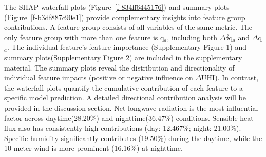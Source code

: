 \bgroup
{}
\begin{figure*}[!htbp]
\centering \makeatletter{}
\makeatother 
\caption{{\textbf{SHAP summary plots showing the distribution and magnitude of feature group impacts}. (a (daytime), b (nighttime)) Each point represents a single instance; the horizontal position indicates the SHAP value (positive values denote an increase in predicted \ensuremath{\Delta }UHI, negative a decrease); the color represents the original feature values (blue: low, red: high).}}
\label{f-b3df887c90e1}
\end{figure*}
\egroup
The SHAP waterfall plots (Figure~\ref{f-834ff6445176}) and summary plots (Figure~\ref{f-b3df887c90e1}) provide complementary insights into feature group contributions. A feature group consists of all variables of the same metric. The only feature group with more than one feature is q\ensuremath{_{a}}, including both \ensuremath{\Delta }\ensuremath{\delta }q\ensuremath{_{a}} and \ensuremath{\Delta }q\ensuremath{_{a}}. The individual feature's feature importance (Supplementary Figure 1) and summary plots(Supplementary Figure 2) are included in the supplementary material. The summary plots reveal the distribution and directionality of individual feature impacts (positive or negative influence on \ensuremath{\Delta }UHI). \mbox{}\protect\newline In contrast, the waterfall plots quantify the cumulative contribution of each feature to a specific model prediction. A detailed directional contribution analysis will be provided in the discussion section. Net longwave radiation is the most influential factor across daytime(28.20\%) and nighttime(36.47\%) conditions. Sensible heat flux also has consistently high contributions (day: 12.467\%; night: 21.00\%). Specific humidity significantly contributes (19.50\%) during the daytime, while the 10-meter wind is more prominent (16.16\%) at nighttime.



